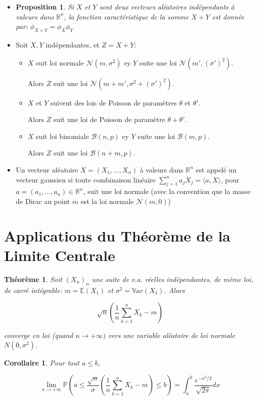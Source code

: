 \documentclass[10pt,a4paper,oneside]{article}
\newtheorem{theoreme}{Théorème}
\newtheorem{proposition}{Proposition}
\newtheorem{corollaire}{Corollaire}
\begin{document}
\begin{itemize}
\item
\begin{proposition}
Si $X$ et $Y$ sont deux vecteurs al\'eatoires ind\'ependants \`a valeurs dans $\mathbb{R^n}$, la fonction caract\'eristique de la somme $X + Y$ est donn\'ee par: $ \phi_{X + Y} = \phi_X \phi_Y$
\end{proposition}

\item
Soit $X,Y$ ind\'ependantes, et $Z = X + Y$:

\begin{itemize}
\item
$X$ suit loi normale $\mathcal{N}(m,\sigma^2)$ ey $Y$ suite une loi $\mathcal{N}(m',(\sigma')^2)$.

Alors $Z$ suit une loi $\mathcal{N}(m + m',\sigma^2 + (\sigma')^2)$.

\item
$X$ et $Y$ suivent des lois de Poisson de param\`etres $\theta$ et $\theta'$.

Alors $Z$ suit une loi de Poisson de param\`etre $\theta + \theta'$.

\item
$X$ suit loi binomiale $\mathcal{B}(n,p)$ ey $Y$ suite une loi $\mathcal{B}(m,p)$.

Alors $Z$ suit une loi $\mathcal{B}(n + m,p)$.
\end{itemize}

\item
Un vecteur al\'eatoire $X = (X_1,\ldots,X_n)$ \`a valeurs dans $\mathbb{R}^n$ est appel\'e un vecteur gaussien si toute combinaison lin\'eaire $\sum_{j = 1}^n a_j X_j = \langle a, X \rangle$, pour $a = (a_1,\ldots,a_n) \in \mathbb{R}^n$, suit une loi normale (avec la convention que la masse de Dirac au point $m$ est la loi normale $\mathcal{N}(m,0)$)

\end{itemize}

\section{Applications du Théorème de la Limite Centrale}

\begin{theoreme}
Soit $(X_n)_n$ une suite de v.a. réelles indépendantes, de même loi, de carré intégrable: $m = \mathbb{E}(X_1)$ et $\sigma^2 = \mathbb{V}ar(X_1)$. Alors

\[ \sqrt{n}(\frac{1}{n}\sum_{k = 1}^n X_k - m) \]

converge en loi (quand $n \to +\infty)$ vers une variable aléatoire de loi normale $N(0,\sigma^2).$
\end{theoreme}


\begin{corollaire}
Pour tout $a \leq b$,

\[ \lim\limits_{n \to +\infty} \mathbb{P}( a \leq \frac{\sqrt{n}}{\sigma}(\frac{1}{n}\sum_{k = 1}^n X_k - m) \leq b ) = \int_{a}^{b}  \frac{e^{ -x^2/2 }}{\sqrt{2 \pi }} dx \]
\end{corollaire}
\end{document}
